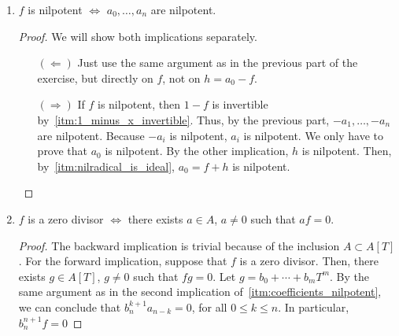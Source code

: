 \begin{problem}
\begin{enumerate}[label=(\theproblem.\arabic*),ref=\theproblem.\arabic*]
        \item $f$ is nilpotent $\iff$ $a_0, \ldots, a_n$ are nilpotent.
            \begin{sol}
                \begin{proof}
                    We will show both implications separately.
                    \begin{itemize}
                        \item[$(\Leftarrow)$]
                        Just use the same argument as in the previous part of the exercise, but directly on $f$, not on $h = a_0-f$.
                        \item[$(\Rightarrow)$]
                        If $f$ is nilpotent, then $1 - f$ is invertible by~\ref{itm:1_minus_x_invertible}.
                        Thus, by the previous part, $-a_1, \ldots, -a_n$ are nilpotent.
                        Because $-a_i$ is nilpotent, $a_i$ is nilpotent.
                        We only have to prove that $a_0$ is nilpotent.
                        By the other implication, $h$ is nilpotent.
                        Then, by~\ref{itm:nilradical_is_ideal}, $a_0 = f + h$ is nilpotent.
                    \end{itemize}
                \end{proof}
            \end{sol}
        \item $f$ is a zero divisor $\iff$ there exists $a \in A$, $a \neq 0$ such that $af = 0$.
            \begin{sol}
                \begin{proof}
                    The backward implication is trivial because of the inclusion $A \subset A[T]$.
                    For the forward implication, suppose that $f$ is a zero divisor.
                    Then, there exists $g \in A[T]$, $g \neq 0$ such that $fg = 0$.
                    Let $g = b_0 + \cdots + b_m T^m$.
                    By the same argument as in the second implication of~\ref{itm:coefficients_nilpotent},
                    we can conclude that $b_n^{k+1} a_{n-k} = 0$, for all $0 \leq k \leq n$.
                    In particular, $b_n^{n+1} f = 0$
                \end{proof}
            \end{sol}
    \end{enumerate}
\end{problem}

